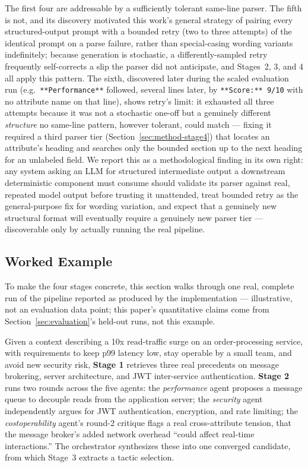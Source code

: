 \documentclass[preprint,12pt,authoryear]{elsarticle}
\renewcommand{\_}{\textunderscore\allowbreak{}}
\begin{document}
The first four are addressable by a sufficiently tolerant same-line parser. The fifth is not, and its discovery motivated this work's general strategy of pairing every structured-output prompt with a bounded retry (two to three attempts) of the identical prompt on a parse failure, rather than special-casing wording variants indefinitely; because generation is stochastic, a differently-sampled retry frequently self-corrects a slip the parser did not anticipate, and Stages~2, 3, and 4 all apply this pattern. The sixth, discovered later during the scaled evaluation run (e.g.\ \texttt{**Performance**} followed, several lines later, by \texttt{**Score:** 9/10} with no attribute name on that line), shows retry's limit: it exhausted all three attempts because it was not a stochastic one-off but a genuinely different \emph{structure} no same-line pattern, however tolerant, could match --- fixing it required a third parser tier (Section~\ref{sec:method-stage4}) that locates an attribute's heading and searches only the bounded section up to the next heading for an unlabeled field. We report this as a methodological finding in its own right: any system asking an LLM for structured intermediate output a downstream deterministic component must consume should validate its parser against real, repeated model output before trusting it unattended, treat bounded retry as the general-purpose fix for wording variation, and expect that a genuinely new structural format will eventually require a genuinely new parser tier --- discoverable only by actually running the real pipeline.

\subsection{Worked Example}
\label{sec:worked-example}

To make the four stages concrete, this section walks through one real, complete run of the pipeline reported as produced by the implementation --- illustrative, not an evaluation data point; this paper's quantitative claims come from Section~\ref{sec:evaluation}'s held-out runs, not this example.

Given a context describing a 10x read-traffic surge on an order-processing service, with requirements to keep p99 latency low, stay operable by a small team, and avoid new security risk, \textbf{Stage 1} retrieves three real precedents on message brokering, server architecture, and JWT inter-service authentication. \textbf{Stage 2} runs two rounds across the five agents: the \emph{performance} agent proposes a message queue to decouple reads from the application server; the \emph{security} agent independently argues for JWT authentication, encryption, and rate limiting; the \emph{cost\_operability} agent's round-2 critique flags a real cross-attribute tension, that the message broker's added network overhead ``could affect real-time interactions.'' The orchestrator synthesizes these into one converged candidate, from which Stage~3 extracts a tactic selection.
\end{document}

